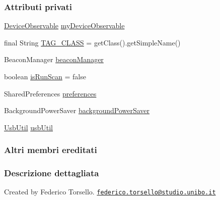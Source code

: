 \subsubsection*{Attributi privati}
\begin{DoxyCompactItemize}
\item 
\hyperlink{classit_1_1unibo_1_1torsello_1_1bluetoothpositioning_1_1observables_1_1DeviceObservable}{Device\+Observable} \hyperlink{classit_1_1unibo_1_1torsello_1_1bluetoothpositioning_1_1activities_1_1ApplicationActivity_aa6481e11e062d3539e6848f0790852b8_aa6481e11e062d3539e6848f0790852b8}{my\+Device\+Observable}
\item 
final String \hyperlink{classit_1_1unibo_1_1torsello_1_1bluetoothpositioning_1_1activities_1_1ApplicationActivity_a65399b7ef86dcff68d09721ed6fdba6b_a65399b7ef86dcff68d09721ed6fdba6b}{T\+A\+G\+\_\+\+C\+L\+A\+SS} = get\+Class().get\+Simple\+Name()
\item 
Beacon\+Manager \hyperlink{classit_1_1unibo_1_1torsello_1_1bluetoothpositioning_1_1activities_1_1ApplicationActivity_a973c37226a3dbba6016966c3555aff65_a973c37226a3dbba6016966c3555aff65}{beacon\+Manager}
\item 
boolean \hyperlink{classit_1_1unibo_1_1torsello_1_1bluetoothpositioning_1_1activities_1_1ApplicationActivity_a16080640c95a73d18c2b7ec21b785af1_a16080640c95a73d18c2b7ec21b785af1}{is\+Run\+Scan} = false
\item 
Shared\+Preferences \hyperlink{classit_1_1unibo_1_1torsello_1_1bluetoothpositioning_1_1activities_1_1ApplicationActivity_a3ee672ef79c268d0618ff3276c2e85f0_a3ee672ef79c268d0618ff3276c2e85f0}{preferences}
\item 
Background\+Power\+Saver \hyperlink{classit_1_1unibo_1_1torsello_1_1bluetoothpositioning_1_1activities_1_1ApplicationActivity_a85885639575161f4d73d4fc788f44ace_a85885639575161f4d73d4fc788f44ace}{background\+Power\+Saver}
\item 
\hyperlink{classit_1_1unibo_1_1torsello_1_1bluetoothpositioning_1_1util_1_1UsbUtil}{Usb\+Util} \hyperlink{classit_1_1unibo_1_1torsello_1_1bluetoothpositioning_1_1activities_1_1ApplicationActivity_abe62157d98c81406ae3d79dbc0fd9093_abe62157d98c81406ae3d79dbc0fd9093}{usb\+Util}
\end{DoxyCompactItemize}
\subsubsection*{Altri membri ereditati}


\subsubsection{Descrizione dettagliata}
Created by Federico Torsello. \href{mailto:federico.torsello@studio.unibo.it}{\tt federico.\+torsello@studio.\+unibo.\+it} 

